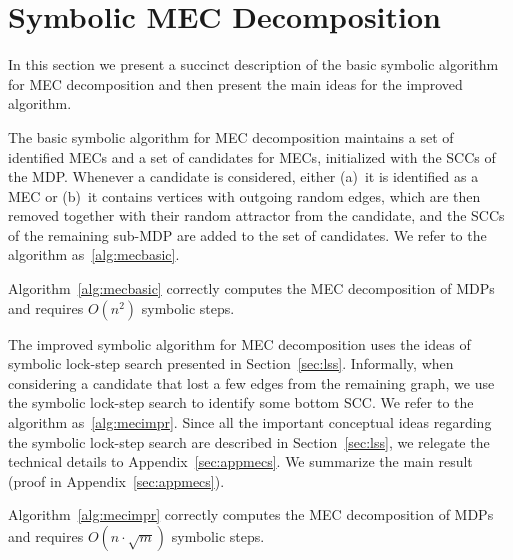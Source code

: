 \vspace{-3mm}
\section{Symbolic MEC Decomposition}\label{sec:mecs}

\vspace{-1mm}
In this section we present a succinct description of the basic symbolic
algorithm for MEC decomposition and then present the main ideas
for the improved algorithm.

\vspace{-0.5mm}
\smallskip{} 
The basic symbolic algorithm for MEC decomposition maintains a set of identified
MECs and a set of candidates for MECs, initialized with the SCCs of the MDP.
Whenever a candidate is considered, either
(a)~it is identified as a MEC or
(b)~it contains vertices with outgoing random edges, which are then removed 
together with their random attractor from the candidate, and the SCCs
of the remaining sub-MDP are added to the set of candidates.
We refer to the algorithm as~\ref{alg:mecbasic}.

\vspace{-0.5mm}
\begin{prp}\label{prp:basicmecs}
Algorithm~\ref{alg:mecbasic} correctly computes the MEC decomposition of MDPs and requires $O(n^2)$ symbolic steps.
\end{prp}

\vspace{-0.5mm}
\smallskip{}
The improved symbolic algorithm for MEC decomposition uses the ideas of symbolic
lock-step search presented in Section~\ref{sec:lss}.
Informally, when considering a candidate that lost a few edges from the remaining
graph, we use the symbolic lock-step search to identify some bottom SCC.
We refer to the algorithm as~\ref{alg:mecimpr}.
Since all the important conceptual ideas regarding the symbolic lock-step search 
are described in Section~\ref{sec:lss}, we relegate the technical details to Appendix~\ref{sec:appmecs}.
We summarize the main result (proof in Appendix~\ref{sec:appmecs}).

\vspace{-0.5mm}
\begin{thm}\label{thm:improvedmecs}
Algorithm~\ref{alg:mecimpr} correctly computes the MEC decomposition of MDPs and requires $O(n\cdot \sqrt{m})$ symbolic steps.
\end{thm}
